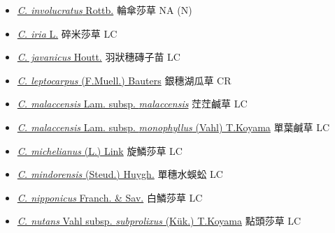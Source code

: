 \begin{itemize}
\begin{itemize}
        \item[] \href{http://www.theplantlist.org/tpl1.1/search?q=Cyperus+involucratus}{\textit{C. involucratus} Rottb.}   輪傘莎草   NA (N)
        \item[] \href{http://www.theplantlist.org/tpl1.1/search?q=Cyperus+iria}{\textit{C. iria} L.}   碎米莎草   LC
        \item[] \href{http://www.theplantlist.org/tpl1.1/search?q=Cyperus+javanicus}{\textit{C. javanicus} Houtt.}   羽狀穗磚子苗   LC
        \item[] \href{http://www.theplantlist.org/tpl1.1/search?q=Cyperus+leptocarpus}{\textit{C. leptocarpus} (F.Muell.) Bauters}   銀穗湖瓜草   CR
        \item[] \href{http://www.theplantlist.org/tpl1.1/search?q=Cyperus+malaccensis+subsp.+malaccensis}{\textit{C. malaccensis} Lam. subsp. \textit{malaccensis}}   茳茳鹹草   LC
        \item[] \href{http://www.theplantlist.org/tpl1.1/search?q=Cyperus+malaccensis+subsp.+monophyllus}{\textit{C. malaccensis} Lam. subsp. \textit{monophyllus} (Vahl) T.Koyama}   單葉鹹草   LC
        \item[] \href{http://www.theplantlist.org/tpl1.1/search?q=Cyperus+michelianus}{\textit{C. michelianus} (L.) Link}   旋鱗莎草   LC
        \item[] \href{http://www.theplantlist.org/tpl1.1/search?q=Cyperus+mindorensis}{\textit{C. mindorensis} (Steud.) Huygh.}   單穗水蜈蚣   LC
        \item[] \href{http://www.theplantlist.org/tpl1.1/search?q=Cyperus+nipponicus}{\textit{C. nipponicus} Franch. \& Sav.}   白鱗莎草   LC
        \item[] \href{http://www.theplantlist.org/tpl1.1/search?q=Cyperus+nutans+subsp.+subprolixus}{\textit{C. nutans} Vahl subsp. \textit{subprolixus} (Kük.) T.Koyama}   點頭莎草   LC

\end{itemize}
\end{itemize}
